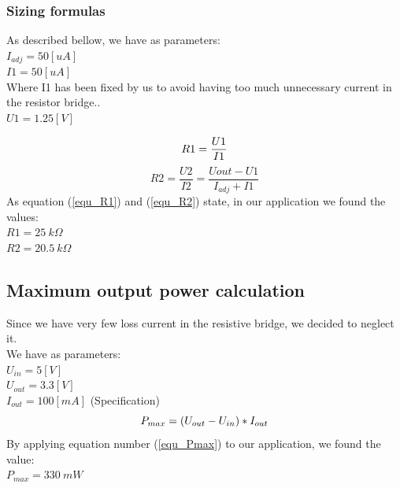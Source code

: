 {\clearpage

\subsubsection{Sizing formulas}
{
As described bellow, we have as parameters:\\
$ I_{adj} = 50 [uA] $ \\
$ I1 = 50 [uA] $ \\
Where I1 has been fixed by us to avoid having too much unnecessary current in the resistor bridge..\\
$ U1 = 1.25 [V] $ 

\begin{equation} \label{equ_R1}
     R1 = \frac{U1}{I1} \\
\end{equation} 
\begin{equation} \label{equ_R2}
     R2 = \frac{U2}{I2} = \frac{Uout - U1}{I_{adj}+I1} 
\end{equation}  
As equation (\ref{equ_R1}) and (\ref{equ_R2}) state, in our application we found the values: 
\\ {$ R1 = 25 \ k\Omega $ \\ $ R2 = 20.5 \ k\Omega $}
}

}

\subsection{Maximum output power calculation} \label{ssec:num02}
{
Since we have very few loss current in the resistive bridge, we decided to neglect it. \\
We have as parameters: \\
$ U_{in} = 5 [V] $ \\
$ U_{out} = 3.3 [V] $ \\
$ I_{out} = 100 [mA] $ (Specification) \\
\begin{equation} \label{equ_Pmax}
     P_{max} = (U_{out}-U_{in})*I_{out} \\
\end{equation} 
By applying equation number (\ref{equ_Pmax}) to our application, we found the value: \\ 
{$ P_{max} = 330 \ mW $}

}


